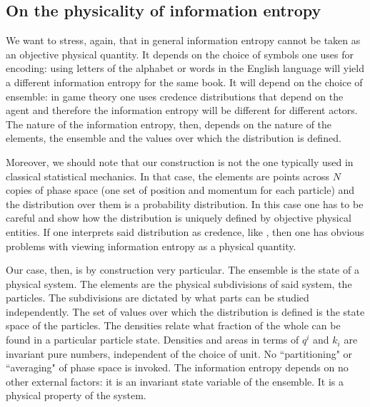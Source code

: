 \documentclass[11pt]{elsarticle}
\begin{document}
\subsection*{On the physicality of information entropy}

We want to stress, again, that in general information entropy cannot be taken as an objective physical quantity. It depends on the choice of symbols one uses for encoding: using letters of the alphabet or words in the English language will yield a different information entropy for the same book. It will depend on the choice of ensemble: in game theory one uses credence distributions that depend on the agent and therefore the information entropy will be different for different actors. The nature of the information entropy, then, depends on the nature of the elements, the ensemble and the values over which the distribution is defined.

Moreover, we should note that our construction is not the one typically used in classical statistical mechanics. In that case, the elements are points across $N$ copies of phase space (one set of position and momentum for each particle) and the distribution over them is a probability distribution. In this case one has to be careful and show how the distribution is uniquely defined by objective physical entities. If one interprets said distribution as credence, like \cite{Jaynes}, then one has obvious problems with viewing information entropy as a physical quantity.

Our case, then, is by construction very particular. The ensemble is the state of a physical system. The elements are the physical subdivisions of said system, the particles. The subdivisions are dictated by what parts can be studied independently. The set of values over which the distribution is defined is the state space of the particles. The densities relate what fraction of the whole can be found in a particular particle state. Densities and areas in terms of $q^i$ and $k_i$ are invariant pure numbers, independent of the choice of unit. No ``partitioning" or ``averaging" of phase space is invoked. The information entropy depends on no other external factors: it is an invariant state variable of the ensemble. It is a physical property of the system.
\end{document}
